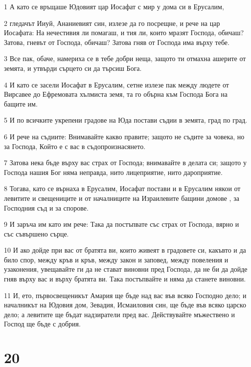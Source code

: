 \par 1 А като се връщаше Юдовият цар Иосафат с мир у дома си в Ерусалим,
\par 2 гледачът Ииуй, Ананиевият син, излезе да го посрещне, и рече на цар Иосафата: На нечестивия ли помагаш, и тия ли, които мразят Господа, обичаш? Затова, гневът от Господа, обичаш? Затова гняв от Господа има върху тебе.
\par 3 Все пак, обаче, намериха се в тебе добри неща, защото ти отмахна ашерите от земята, и утвърди сърцето си да търсиш Бога.
\par 4 И като се засели Иосафат в Ерусалим, сетне излезе пак между людете от Вирсавее до Ефремовата хълмиста земя, та го обърна към Господа Бога на бащите им.
\par 5 И по всичките укрепени градове на Юда постави съдии в земята, град по град.
\par 6 И рече на съдиите: Внимавайте какво правите; защото не съдите за човека, но за Господа, Който е с вас в съдопроизнасянето.
\par 7 Затова нека бъде върху вас страх от Господа; внимавайте в делата си; защото у Господа нашия Бог няма неправда, нито лицеприятие, нито дароприятие.
\par 8 Тогава, като се върнаха в Ерусалим, Иосафат постави и в Ерусалим някои от левитите и свещениците и от началниците на Израилевите бащини домове , за Господния съд и за спорове.
\par 9 И заръча им като им рече: Така да постъпвате със страх от Господа, вярно и със съвършено сърце.
\par 10 И ако дойде при вас от братята ви, които живеят в градовете си, какъвто и да било спор, между кръв и кръв, между закон и заповед, между повеления и узаконения, увещавайте ги да не стават виновни пред Господа, да не би да дойде гняв върху вас и върху братята ви. Така постъпвайте и няма да станете виновни.
\par 11 И, ето, първосвещеникът Амария ще бъде над вас във всяко Господно дело; и началникът на Юдовия дом, Зевадия, Исмаиловия син, ще бъде във всяко царско дело; а левитите ще бъдат надзиратели пред вас. Действувайте мъжествено и Господ ще бъде с добрия.

\chapter{20}


